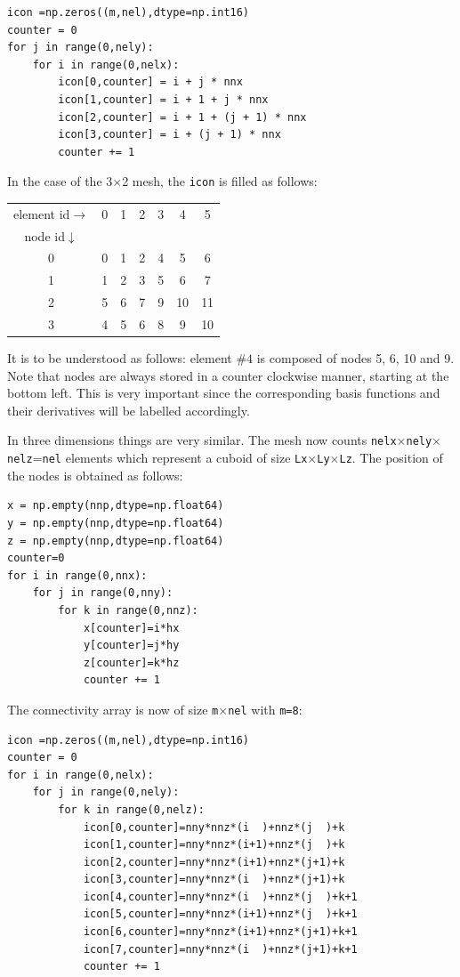 \begin{lstlisting}
icon =np.zeros((m,nel),dtype=np.int16)
counter = 0
for j in range(0,nely):
    for i in range(0,nelx):
        icon[0,counter] = i + j * nnx 
        icon[1,counter] = i + 1 + j * nnx 
        icon[2,counter] = i + 1 + (j + 1) * nnx 
        icon[3,counter] = i + (j + 1) * nnx 
        counter += 1
\end{lstlisting}

In the case of the 3$\times$2 mesh, the {\tt icon} is filled as follows:
\begin{center}
\begin{tabular}{ccccccc}
element id$\rightarrow$ &0 &1&2&3&4&5 \\
node id$\downarrow$ \\
0& 0& 1& 2& 4& 5  &6\\
1& 1& 2& 3& 5& 6  &7\\
2& 5& 6& 7& 9& 10 &11\\
3& 4& 5& 6& 8& 9  &10\\
\end{tabular}
\end{center}
It is to be understood as follows: element $\#4$ is composed of nodes 5, 6, 10 and 9.
Note that nodes are always stored in a counter clockwise manner, starting at the bottom left.
This is very important since the corresponding basis functions and their derivatives 
will be labelled accordingly.

In three dimensions things are very similar. The mesh now counts 
{\tt nelx}$\times${\tt nely}$\times${\tt nelz}={\tt nel} elements which represent 
a cuboid of size {\tt Lx}$\times${\tt Ly}$\times${\tt Lz}.
The position of the nodes is obtained as follows:
\begin{lstlisting}
x = np.empty(nnp,dtype=np.float64)
y = np.empty(nnp,dtype=np.float64)
z = np.empty(nnp,dtype=np.float64)
counter=0
for i in range(0,nnx):
    for j in range(0,nny):
        for k in range(0,nnz):
            x[counter]=i*hx
            y[counter]=j*hy
            z[counter]=k*hz
            counter += 1
\end{lstlisting}
The connectivity array is now of size {\tt m}$\times${\tt nel} with {\tt m=8}:
\begin{lstlisting}
icon =np.zeros((m,nel),dtype=np.int16)
counter = 0
for i in range(0,nelx):
    for j in range(0,nely):
        for k in range(0,nelz):
            icon[0,counter]=nny*nnz*(i  )+nnz*(j  )+k
            icon[1,counter]=nny*nnz*(i+1)+nnz*(j  )+k
            icon[2,counter]=nny*nnz*(i+1)+nnz*(j+1)+k
            icon[3,counter]=nny*nnz*(i  )+nnz*(j+1)+k
            icon[4,counter]=nny*nnz*(i  )+nnz*(j  )+k+1
            icon[5,counter]=nny*nnz*(i+1)+nnz*(j  )+k+1
            icon[6,counter]=nny*nnz*(i+1)+nnz*(j+1)+k+1
            icon[7,counter]=nny*nnz*(i  )+nnz*(j+1)+k+1
            counter += 1
\end{lstlisting}

